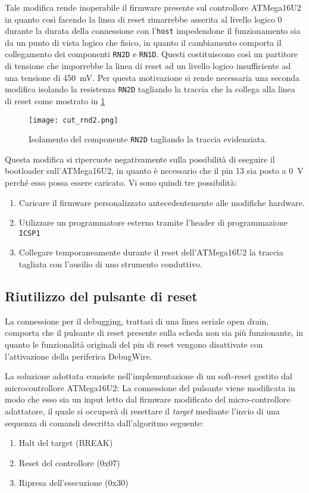 Tale modifica rende inoperabile il firmware presente sul controllore ATMega16U2 in quanto così facendo la linea di reset rimarrebbe asserita al livello logico 0 durante la durata della connessione con l'\texttt{host} impedendone il funzionamento sia da un punto di vista logico che fisico, in quanto il cambiamento comporta il collegamento dei componenti \texttt{RN2D} e \texttt{RN1D}. Questi costituiscono così un partitore di tensione che imporrebbe la linea di reset ad un livello logico insufficiente ad una tensione di \SI{450}{\milli\volt}. 
Per questa motivazione si rende necessaria una seconda modifica isolando la resistenza \texttt{RN2D} tagliando la traccia che la collega alla linea di reset come mostrato in \cref{fig:cut-rnd2}

\begin{figure}[b]
    \centering
    \texttt{[image: cut\_rnd2.png]}
    \caption[]{Isolamento del componente \texttt{RN2D} tagliando la traccia evidenziata.}\label{fig:cut-rnd2}
\end{figure}

Questa modifica si ripercuote negativamente sulla possibilità di eseguire il bootloader sull'ATMega16U2, in quanto è necessario che il pin 13 sia posto a \SI{0}{\volt} perché esso possa essere caricato\cite[sec 23.6.3]{avr:m16u2}. Vi sono quindi tre possibilità:
\begin{enumerate}
    \item Caricare il firmware personalizzato antecedentemente alle modifiche hardware.
    \item Utilizzare un programmatore esterno tramite l'header di programmazione \texttt{ICSP1}
    \item Collegare temporaneamente durante il reset dell'ATMega16U2 la traccia tagliata con l'ausilio di uno strumento conduttivo.
\end{enumerate} 

\subsection{Riutilizzo del pulsante di reset}

La connessione per il debugging, trattasi di una linea seriale open drain, comporta che il pulsante di reset presente sulla scheda non sia più funzionante, in quanto le funzionalità originali del pin di reset vengono disattivate con l'attivazione della periferica DebugWire.

La soluzione adottata consiste nell'implementazione di un soft-reset gestito dal microcontrollore ATMega16U2: La connessione del pulsante viene modificata in modo che esso sia un input letto dal firmware modificato del micro-controllore adattatore, il quale si occuperà di resettare il \textit{target} mediante l'invio di una sequenza di comandi descritta dall'algoritmo seguente:
\begin{enumerate}
    \item Halt del target (BREAK)
    \item Reset del controllore (0x07)
    \item Ripresa dell'esecuzione (0x30)
\end{enumerate}

